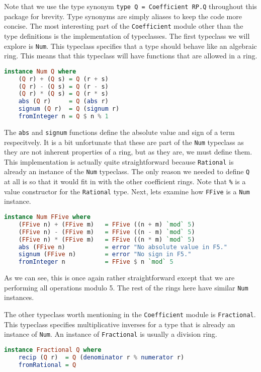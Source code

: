 \documentclass[MS, xcolor=dvipsnames]{wfuthesis}
\theoremstyle{definition}
\begin{document}
Note that we use the type synonym \lstinline{type Q = Coefficient RP.Q} throughout this package for brevity. Type synonyms are simply aliases to keep the code more concise. The most interesting part of the \lstinline{Coefficient} module other than the type definitions is the implementation of typeclasses. The first typeclass we will explore is \lstinline{Num}. This typeclass specifies that a type should behave like an algebraic ring. This means that this typeclass will have functions that are allowed in a ring. 
\begin{lstlisting}[language=Haskell]
instance Num Q where
    (Q r) + (Q s) = Q (r + s)
    (Q r) - (Q s) = Q (r - s)
    (Q r) * (Q s) = Q (r * s)
    abs (Q r)     = Q (abs r)
    signum (Q r)  = Q (signum r)
    fromInteger n = Q $ n % 1
\end{lstlisting}
The \lstinline{abs} and \lstinline{signum} functions define the absolute value and sign of a term respecitvely. It is a bit unfortunate that these are part of the \lstinline{Num} typeclass as they are not inherent properties of a ring, but as they are, we must define them. This implementation is actually quite straightforward because \lstinline{Rational} is already an instance of the \lstinline{Num} typeclass. The only reason we needed to define \lstinline{Q} at all is so that it would fit in with the other coefficient rings. Note that \lstinline{%} is a value constructor for the \lstinline{Rational} type. Next, lets examine how \lstinline{FFive} is a \lstinline{Num} instance. 
\begin{lstlisting}[language=Haskell]
instance Num FFive where
    (FFive n) + (FFive m)   = FFive ((n + m) `mod` 5)
    (FFive n) - (FFive m)   = FFive ((n - m) `mod` 5)
    (FFive n) * (FFive m)   = FFive ((n * m) `mod` 5)
    abs (FFive n)           = error "No absolute value in F5."
    signum (FFive n)        = error "No sign in F5."
    fromInteger n           = FFive $ n `mod` 5
\end{lstlisting}
As we can see, this is once again rather straightforward except that we are performing all operations modulo 5. The rest of the rings here have similar \lstinline{Num} instances. \par 
The other typeclass worth mentioning in the \lstinline{Coefficient} module is \lstinline{Fractional}. This typeclass specifies multiplicative inverses for a type that is already an instance of \lstinline{Num}. An instance of \lstinline{Fractional} is usually a division ring. 
\begin{lstlisting}[language=Haskell]
instance Fractional Q where
    recip (Q r)  = Q (denominator r % numerator r)
    fromRational = Q
\end{lstlisting}
\end{document}

